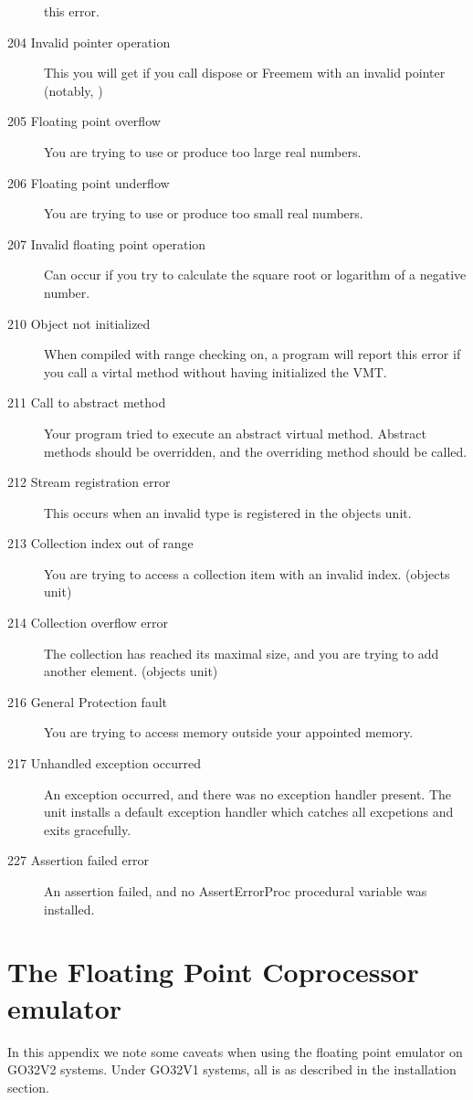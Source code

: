 \documentclass{book}
\begin{document}
\begin{description}
this error.
\item [204  Invalid pointer operation]
This you will get if you call dispose or Freemem with an invalid pointer
(notably, )
\item [205  Floating point overflow]
You are trying to use or produce too large real numbers.
\item [206  Floating point underflow]
You are trying to use or produce too small real numbers.
\item [207  Invalid floating point operation]
Can occur if you try to calculate the square root or logarithm of a negative
number.
\item [210  Object not initialized]
When compiled with range checking on, a program will report this error if
you call a virtal method without having initialized the VMT.
\item [211  Call to abstract method]
Your program tried to execute an abstract virtual method. Abstract methods
should be overridden, and the overriding method should be called.
\item [212  Stream registration error]
This occurs when an invalid type is registered in the objects unit.
\item [213  Collection index out of range]
You are trying to access a collection item with an invalid index.
(objects unit)
\item [214  Collection overflow error]
The collection has reached its maximal size, and you are trying to add
another element. (objects unit)
\item [216  General Protection fault]
You are trying to access memory outside your appointed memory.
\item [217 Unhandled exception occurred]
An exception occurred, and there was no exception handler present.
The  unit installs a default exception handler which catches
all excpetions and exits gracefully.
\item [227 Assertion failed error]
An assertion failed, and no AssertErrorProc procedural variable was installed.
\end{description}


\chapter{The Floating Point Coprocessor emulator}

In this appendix we note some caveats when using the floating point
emulator on GO32V2 systems. Under GO32V1 systems, all is as described in
the installation section.
\end{document}
